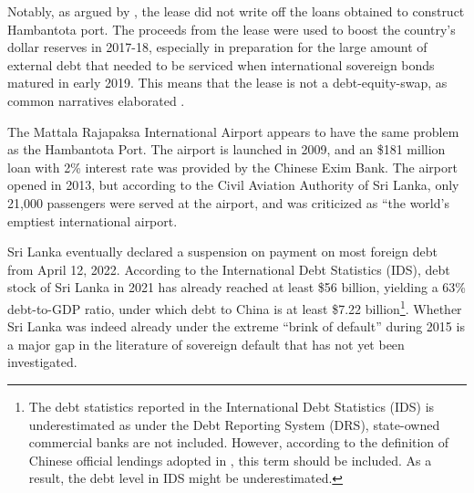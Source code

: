 Notably, as argued by \citet*{Moramudali_2019}, the lease did not write off the loans obtained to construct Hambantota port. The proceeds from the lease were used to boost the country's dollar reserves in 2017-18, especially in preparation for the large amount of external debt that needed to be serviced when international sovereign bonds matured in early 2019. This means that the lease is not a debt-equity-swap, as common narratives elaborated \citep*{Moramudali_2020}.


The Mattala Rajapaksa International Airport appears to have the same problem as the Hambantota Port. The airport is launched in 2009, and an \$181 million loan with 2\% interest rate was provided by the Chinese Exim Bank. The airport opened in 2013, but according to the Civil Aviation Authority of Sri Lanka, only 21,000 passengers were served at the airport, and was criticized as ``the world's emptiest international airport\citep*{shepard-16-airport-empty}.

Sri Lanka eventually declared a suspension on payment on most foreign debt from April 12, 2022. According to the International Debt Statistics (IDS), debt stock of Sri Lanka in 2021 has already reached at least \$56 billion, yielding a 63\% debt-to-GDP ratio, under which debt to China is at least \$7.22 billion\footnote{
    The debt statistics reported in the International Debt Statistics (IDS) is underestimated as under the Debt Reporting System (DRS), state-owned commercial banks are not included. However, according to the definition of Chinese official lendings adopted in \citet*{Horn-Reinhart-Trebesch-21}, this term should be included. As a result, the debt level in IDS might be underestimated.
}. Whether Sri Lanka was indeed already under the extreme ``brink of default'' during 2015 is a major gap in the literature of sovereign default that has not yet been investigated.
